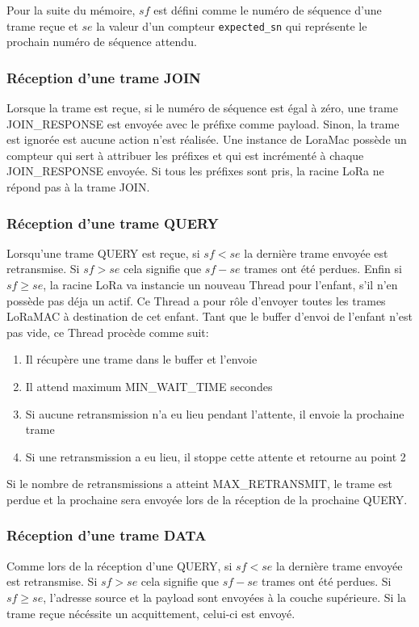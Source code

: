     Pour la suite du mémoire, $sf$ est défini comme le numéro de séquence d'une trame reçue et $se$ 
    la valeur d'un compteur \texttt{expected\_sn} qui représente le prochain numéro de séquence 
    attendu.

    
    \subsubsection*{Réception d'une trame JOIN}
    Lorsque la trame est reçue, si le numéro de séquence est égal à zéro, une trame 
    JOIN\_RESPONSE est envoyée avec le préfixe comme payload. Sinon, la trame est ignorée est 
    aucune action n'est réalisée. Une instance de LoraMac possède un compteur qui sert à attribuer 
    les préfixes et qui est incrémenté à chaque JOIN\_RESPONSE envoyée. Si tous les préfixes sont pris, la racine LoRa ne répond pas à la trame JOIN.

    \subsubsection*{Réception d'une trame QUERY}
    Lorsqu'une trame QUERY est reçue, si $sf < se$ la dernière trame envoyée est retransmise. Si
    $sf > se$ cela signifie que $sf-se$ trames ont été perdues. Enfin si $sf \geq se$, la racine LoRa va instancie un nouveau Thread pour l'enfant, s'il n'en possède pas déja un actif. Ce Thread a pour rôle d'envoyer toutes les trames LoRaMAC à destination de cet enfant.
    Tant que le buffer d'envoi de l'enfant n'est pas vide, ce Thread procède comme suit:
    \begin{enumerate}
        \item Il récupère une trame dans le buffer et l'envoie
        \item Il attend maximum MIN\_WAIT\_TIME secondes
        \item Si aucune retransmission n'a eu lieu pendant l'attente, il envoie la prochaine trame
        \item Si une retransmission a eu lieu, il stoppe cette attente et retourne au point 2
    \end{enumerate}

    Si le nombre de retransmissions a atteint MAX\_RETRANSMIT, le trame est perdue et la prochaine sera envoyée lors de la réception de la prochaine QUERY.

    \subsubsection*{Réception d'une trame DATA}
        Comme lors de la réception d'une QUERY, si $sf < se$ la dernière trame envoyée est retransmise. Si $sf > se$ cela signifie que $sf-se$ trames ont été perdues. Si $sf \geq se$, l'adresse source et la payload sont envoyées à la couche supérieure. Si la trame reçue nécéssite un acquittement, celui-ci est envoyé.


